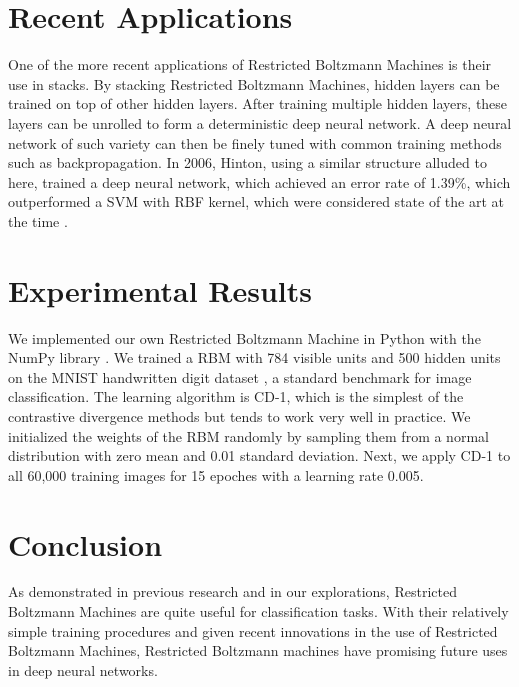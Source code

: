 \documentclass[journal]{IEEEtran}
\begin{document}
\section{Recent Applications}
One of the more recent applications of Restricted Boltzmann Machines is their use in stacks.  By stacking Restricted Boltzmann Machines, hidden layers can be trained on top of other hidden layers.  After training multiple hidden layers, these layers can be unrolled to form a deterministic deep neural network.  A deep neural network of such variety can then be finely tuned with common training methods such as backpropagation.  In 2006, Hinton, using a similar structure alluded to here, trained a deep neural network, which achieved an error rate of 1.39\%, which outperformed a SVM with RBF kernel, which were considered state of the art at the time \cite{hinton2006fast}.

\section{Experimental Results}
We implemented our own Restricted Boltzmann Machine in Python with the NumPy library \cite{oliphant2006guide}. We trained a RBM with 784 visible units and 500 hidden units on the MNIST handwritten digit dataset \cite{deng2012mnist}, a standard benchmark for image classification. The learning algorithm is CD-1, which is the simplest of the contrastive divergence methods but tends to work very well in practice. We initialized the weights of the RBM randomly by sampling them from a normal distribution with zero mean and 0.01 standard deviation. Next, we apply CD-1 to all 60,000 training images for 15 epoches with a learning rate 0.005. 

\section{Conclusion}
As demonstrated in previous research and in our explorations, Restricted Boltzmann Machines are quite useful for classification tasks.  With their relatively simple training procedures and given recent innovations in the use of Restricted Boltzmann Machines, Restricted Boltzmann machines have promising future uses in deep neural networks.



\end{document}
